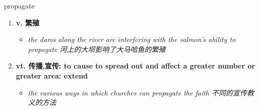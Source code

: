 
\begin{frame}
{\huge propagate}
\begin{center}
\begin{enumerate}\Large
  \item \textbf{v. 繁殖}
  \begin{itemize}
    \item \em{\Large{the dams along the river are interfering with the salmon's ability to propagate 河上的大坝影响了大马哈鱼的繁殖}}
  \end{itemize}
  \item \textbf{vt. 传播,宣传: to cause to spread out and affect a greater number or greater area: extend}
  \begin{itemize}
    \item \em{\Large{the various ways in which churches can propagate the faith 不同的宣传教义的方法}}
  \end{itemize}
\end{enumerate}
\end{center}
\end{frame}
